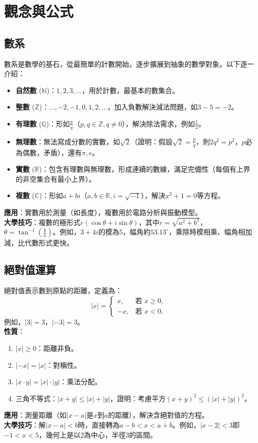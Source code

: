 
\section{觀念與公式}

\subsection{數系}
數系是數學的基石，從最簡單的計數開始，逐步擴展到抽象的數學對象。以下逐一介紹：
\begin{itemize}
    \item \textbf{自然數} ($\mathbb{N}$)：$1, 2, 3, \dots$，用於計數，最基本的數集合。
    \item \textbf{整數} ($\mathbb{Z}$)：$\dots, -2, -1, 0, 1, 2, \dots$，加入負數解決減法問題，如$3 - 5 = -2$。
    \item \textbf{有理數} ($\mathbb{Q}$)：形如$\frac{p}{q}$（$p, q \in \mathbb{Z}, q \neq 0$），解決除法需求，例如$\frac{1}{2}$。
    \item \textbf{無理數}：無法寫成分數的實數，如$\sqrt{2}$（證明：假設$\sqrt{2} = \frac{p}{q}$，則$2q^2 = p^2$，$p$必為偶數，矛盾），還有$\pi, e$。
    \item \textbf{實數} ($\mathbb{R}$)：包含有理數與無理數，形成連續的數線，滿足完備性（每個有上界的非空集合有最小上界）。
    \item \textbf{複數} ($\mathbb{C}$)：形如$a + bi$（$a, b \in \mathbb{R}, i = \sqrt{-1}$），解決$x^2 + 1 = 0$等方程。
\end{itemize}
\textbf{應用}：實數用於測量（如長度），複數用於電路分析與振動模型。\\
\textbf{大學技巧}：複數的極形式$r(\cos\theta + i\sin\theta)$，其中$r = \sqrt{a^2 + b^2}$，$\theta = \tan^{-1}\left(\frac{b}{a}\right)$。例如，$3 + 4i$的模為$5$，幅角約$53.13^\circ$，乘除時模相乘、幅角相加減，比代數形式更快。

\subsection{絕對值運算}
絕對值表示數到原點的距離，定義為：
\[
|x| =
\begin{cases} 
x, & \text{若 } x \geq 0, \\
-x, & \text{若 } x < 0.
\end{cases}
\]
例如，$|3| = 3$，$|-3| = 3$。\\
\textbf{性質}：
\begin{enumerate}
    \item $|x| \geq 0$：距離非負。
    \item $|-x| = |x|$：對稱性。
    \item $|x \cdot y| = |x| \cdot |y|$：乘法分配。
    \item 三角不等式：$|x + y| \leq |x| + |y|$，證明：考慮平方$(x + y)^2 \leq (|x| + |y|)^2$。
\end{enumerate}
\textbf{應用}：測量距離（如$|x - a|$是$x$到$a$的距離），解決含絕對值的方程。\\
\textbf{大學技巧}：解$|x - a| < b$時，直接轉為$a - b < x < a + b$。例如，$|x - 2| < 3$即$-1 < x < 5$，幾何上是以$2$為中心，半徑$3$的區間。


